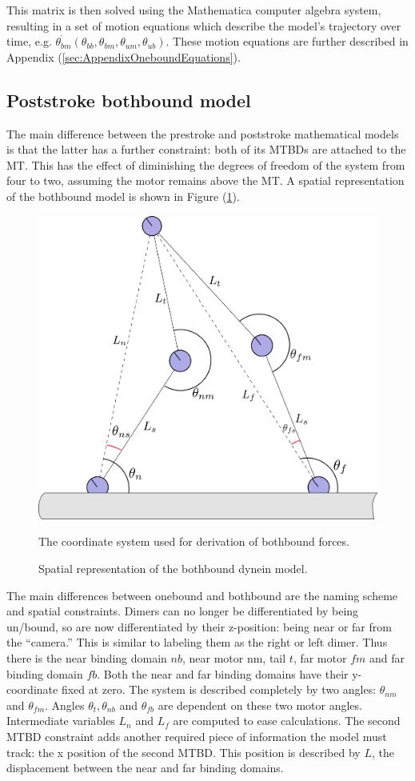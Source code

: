 \documentclass[
11pt, %
english, %
singlespacing, %
headsepline, %
chapterinoneline, %
]{MastersDoctoralThesis} %
\begin{document}
This matrix is then solved using the Mathematica computer algebra system, resulting in a set of motion equations which describe the model's trajectory over time, e.g. $\dot{\theta_{bm}}(\theta_{bb}, \theta_{bm}, \theta_{um}, \theta_{ub})$. These motion equations are further described in Appendix (\ref{sec:AppendixOneboundEquations}).\\

\subsection{Poststroke bothbound model}
The main difference between the prestroke and poststroke mathematical models is that the latter has a further constraint: both of its MTBDs are attached to the MT. This has the effect of diminishing the degrees of freedom of the system from four to two, assuming the motor remains above the MT. A spatial representation of the bothbound model is shown in Figure (\ref{fig:derivation-bothbound}).\\

\begin{figure}[h]
  \centering
  \includegraphics[width=.45\textwidth]{../../figures/derivation-bothbound}
  \caption{Spatial representation of the bothbound dynein model.}{The coordinate system used for derivation of bothbound forces.}
  \label{fig:derivation-bothbound}
\end{figure}

The main differences between onebound and bothbound are the naming scheme and spatial constraints. Dimers can no longer be differentiated by being un/bound, so are now differentiated by their z-position: being near or far from the ``camera.'' This is similar to labeling them as the right or left dimer. Thus there is the near binding domain $nb$, near motor $\text{nm}$, tail $t$, far motor $fm$ and far binding domain $fb$. Both the near and far binding domains have their y-coordinate fixed at zero. The system is described completely by two angles: $\theta_{nm}$ and $\theta_{fm}$. Angles $\theta_t, \theta_{nb}$ and $\theta_{fb}$ are dependent on these two motor angles. Intermediate variables $L_{n}$ and $L_{f}$ are computed to ease calculations. The second MTBD constraint adds another required piece of information the model must track: the x position of the second MTBD. This position is described by $L$, the displacement between the near and far binding domains.\\
\end{document}
